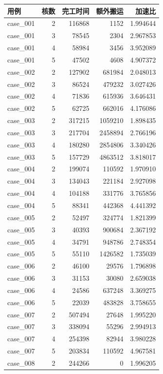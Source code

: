 \begin{longtable}{lrrrr}
用例 & 核数 & 完工时间 & 额外搬运 & 加速比 \\ \hline
\endhead
case\_001 & 2 & 116868 & 1152 & 1.994644 \\
case\_001 & 3 & 78545 & 2304 & 2.967853 \\
case\_001 & 4 & 58984 & 3456 & 3.952089 \\
case\_001 & 5 & 47502 & 4608 & 4.907372 \\
case\_002 & 2 & 127902 & 681984 & 2.048013 \\
case\_002 & 3 & 86524 & 479232 & 3.027426 \\
case\_002 & 4 & 71836 & 615936 & 3.646431 \\
case\_002 & 5 & 62725 & 662016 & 4.176086 \\
case\_003 & 2 & 317215 & 1059210 & 1.898435 \\
case\_003 & 3 & 217704 & 2458894 & 2.766196 \\
case\_003 & 4 & 180280 & 2854806 & 3.340426 \\
case\_003 & 5 & 157729 & 4863512 & 3.818017 \\
case\_004 & 2 & 199074 & 110592 & 1.970910 \\
case\_004 & 3 & 134043 & 221184 & 2.927098 \\
case\_004 & 4 & 104188 & 331776 & 3.765856 \\
case\_004 & 5 & 88341 & 442368 & 4.441392 \\
case\_005 & 2 & 52497 & 324774 & 1.821399 \\
case\_005 & 3 & 40393 & 900684 & 2.367192 \\
case\_005 & 4 & 34791 & 948786 & 2.748354 \\
case\_005 & 5 & 55110 & 1426582 & 1.735039 \\
case\_006 & 2 & 46100 & 29576 & 1.796898 \\
case\_006 & 3 & 31153 & 30080 & 2.659038 \\
case\_006 & 4 & 24586 & 637248 & 3.369275 \\
case\_006 & 5 & 22039 & 483828 & 3.758655 \\
case\_007 & 2 & 507494 & 27648 & 1.995220 \\
case\_007 & 3 & 338094 & 55296 & 2.994913 \\
case\_007 & 4 & 254398 & 82944 & 3.980228 \\
case\_007 & 5 & 203834 & 110592 & 4.967581 \\
case\_008 & 2 & 244266 & 0 & 1.996205 \\

\end{longtable}
